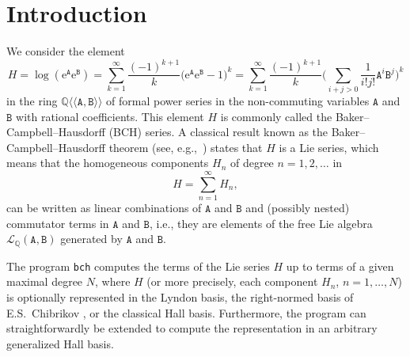 \documentclass[11pt,a4paper]{article}
\newcommand{\nL}{\mathcal{L}}
\newcommand{\ee}{\mathrm{e}}
\renewcommand{\AA}{\mathtt{A}}
\newcommand{\BB}{\mathtt{B}}
\newcommand{\QQ}{\mathbb{Q}}
\begin{document}
\section{Introduction}
We consider the element 
\begin{equation}\label{eq:BCH_element}
H = \log(\ee^{\AA}\ee^{\BB})
= \sum_{k=1}^\infty\frac{(-1)^{k+1}}{k}\big(\ee^{\AA}\ee^{\BB}-1\big)^k
= \sum_{k=1}^\infty\frac{(-1)^{k+1}}{k}\bigg(\sum_{i+j>0}\frac{1}{i!j!}\AA^i\BB^j\bigg)^k %
\end{equation}
in the ring $\QQ\langle\langle\AA,\BB\rangle\rangle$  of formal power series 
in the non-commuting variables $\AA$ and $\BB$ with rational coefficients.
This element $H$ is commonly called the Baker--Campbell--Hausdorff (BCH) series. 
A classical result known as the
 Baker--Campbell--Hausdorff theorem (see, e.g.,~\cite{HHproof}) states that 
$H$
is a Lie series, which means that the 
homogeneous components $H_n$ of degree $n=1,2,\dots$ in
\begin{equation}
H=\sum_{n=1}^\infty H_n, %
\end{equation}
can be written as  linear combinations of 
$\AA$ and $\BB$ and (possibly nested) 
 commutator terms in $\AA$ and $\BB$, i.e., they
 are 
elements of the
free Lie algebra $\nL_\QQ(\AA,\BB)$ %
generated by $\AA$ and $\BB$.  

The program \verb|bch| computes the terms of the Lie series $H$ 
up to terms of a given maximal degree $N$, where $H$ (or more precisely, each
component $H_n$, $n=1,\dots,N$) is optionally represented in the Lyndon basis, the right-normed
basis of E.S.~Chibrikov \cite{Chibrikov}, or the classical Hall basis. Furthermore, the program can straightforwardly
be extended to compute the representation in an arbitrary generalized Hall basis.
\end{document}
